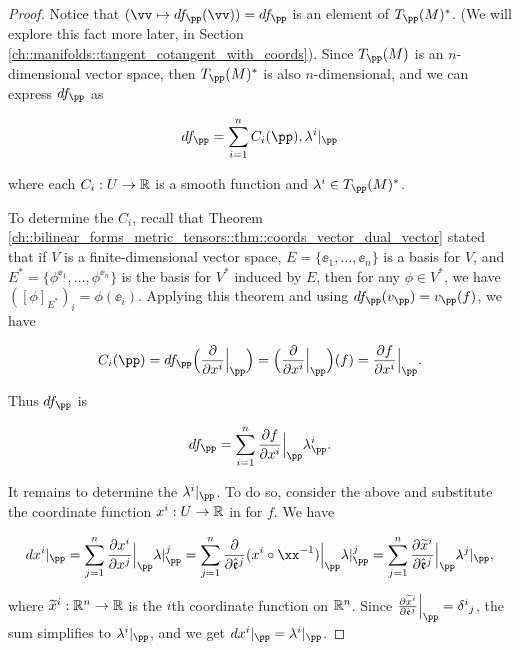 \begin{proof}
    Notice that $(\vv \mapsto df_\pp(\vv)) = df_\pp$ is an element of $T_\pp(M)^*$. (We will explore this fact more later, in Section \ref{ch::manifolds::tangent_cotangent_with_coords}). Since $T_\pp(M)$ is an $n$-dimensional vector space, then $T_\pp(M)^*$ is also $n$-dimensional, and we can express $df_\pp$ as
    
    \begin{align*}
        df_\pp = \sum_{i = 1}^n C_i(\pp), \lambda^i|_\pp
    \end{align*}
    
    where each $C_i:U \rightarrow \mathbb{R}$ is a smooth function and $\lambda^i \in T_\pp(M)^*$.
    
    To determine the $C_i$, recall that Theorem \ref{ch::bilinear_forms_metric_tensors::thm::coords_vector_dual_vector} stated that if $V$ is a finite-dimensional vector space, $E = \{\ee_1, ..., \ee_n\}$ is a basis for $V$, and $E^* = \{\phi^{\ee_1}, ..., \phi^{\ee_n}\}$ is the basis for $V^*$ induced by $E$, then for any $\phi \in V^*$, we have $([\phi]_{E^*})_i = \phi(\ee_i)$. Applying this theorem and using $df_\pp(v_\pp) = v_\pp(f)$, we have
    
    \begin{align*}
        C_i(\pp) = df_\pp\Big( \frac{\pd}{\pd x^i}\Big|_\pp \Big) = \Big( \frac{\pd}{\pd x^i}\Big|_\pp \Big) (f) = \frac{\pd f}{\pd x^i}\Big|_\pp.
    \end{align*}
    
    Thus $df_\pp$ is
    
    \begin{align*}
        df_\pp = \sum_{i = 1}^n \frac{\pd f}{\pd x^i}\Big|_\pp \lambda^i_\pp.
    \end{align*}
    
    It remains to determine the $\lambda^i|_\pp$. To do so, consider the above and substitute the coordinate function $x^i:U \rightarrow \mathbb{R}$ in for $f$. We have
    
    \begin{align*}
        dx^i|_\pp = \sum_{j = 1}^n \frac{\pd x^i}{\pd x^j}\Big|_\pp \lambda|_\pp^j = \sum_{j = 1}^n \frac{\pd}{\pd \see^j}(x^i \circ \xx^{-1}) \Big|_\pp \lambda|_\pp^j = \sum_{j = 1}^n \frac{\pd \widetilde{x}^i}{\pd \see^j}\Big|_\pp \lambda^j|_\pp,
    \end{align*}

    where $\widetilde{x}^i:\mathbb{R}^n \rightarrow \mathbb{R}$ is the $i$th coordinate function on $\mathbb{R}^n$. Since $\frac{\pd \widetilde{x}^i}{\pd \see^j}\Big|_\pp = \delta^i{}_j$, the sum simplifies to $\lambda^i|_\pp$, and we get $dx^i|_\pp = \lambda^i|_\pp$.
\end{proof}

